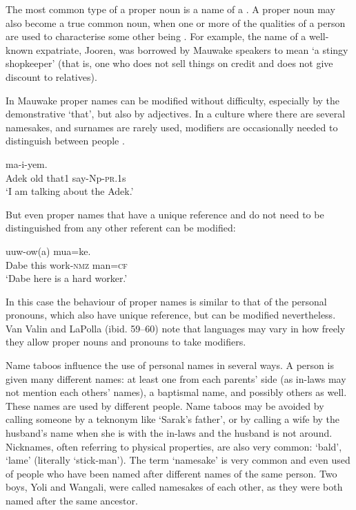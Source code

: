The most common type of a proper noun is a name of a . A proper noun may also become a true common noun, when one or more of the qualities of a person are used to characterise some other being \citep[66]{Jespersen1924}. For example, the name of a well-known expatriate, Jooren, was borrowed by Mauwake speakers to mean `a stingy shopkeeper' (that is, one who does not sell things on credit and does not give discount to relatives). 

In Mauwake proper names can be modified without difficulty, especially by the demonstrative  `that', but also by adjectives. In a culture where there are several namesakes, and surnames are rarely used, modifiers are occasionally needed to distinguish between people .

\ea%
\label{ex:3:x27}
\gll {}   ma-i-yem. \\
Adek old that1 say-Np-\textsc{pr}.1s\\
\glt`I am talking about the  Adek.'
\z

But even proper names that have a unique reference and do not need to be distinguished from any other referent can be modified:

\ea%
\label{ex:3:x106}
\gll {}  uuw-ow(a) mua=ke. \\
Dabe this work-\textsc{nmz} man=\textsc{cf}\\
\glt`Dabe here is a hard worker.'
\z

In this case the behaviour of proper names is similar to that of the personal pronouns, which also have unique reference, but can be modified nevertheless. {Van Valin and LaPolla} (ibid. 59--60) note that languages may vary in how freely they allow proper nouns and pronouns to take modifiers.

Name taboos influence the use of personal names in several ways. A person is given many different names: at least one from each parents' side (as in-laws may not mention each others' names), a baptismal name, and possibly others as well. These names are used by different people. Name taboos may be avoided by calling someone by a teknonym like `Sarak's father', or by calling a wife by the husband's name when she is with the in-laws and the husband is not around. Nicknames, often referring to physical properties, are also very common:  `bald',  `lame' (literally `stick-man'). The term `namesake' is very common and even used of people who have been named after different names of the same person. Two boys, Yoli and Wangali, were called namesakes of each other, as they were both named after the same ancestor. 

